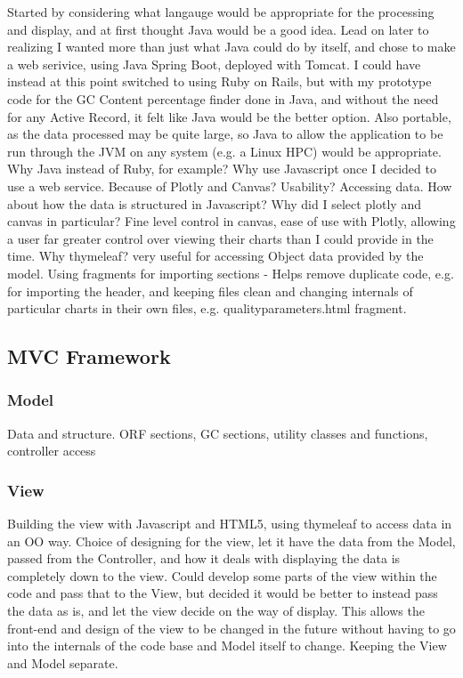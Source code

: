 Started by considering what langauge would be appropriate for the processing and display, and at first thought Java would be a good idea. Lead on later to realizing I wanted more than just what Java could do by itself, and chose to make a web serivice, using Java Spring Boot, deployed with Tomcat. I could have instead at this point switched to using Ruby on Rails, but with my prototype code for the GC Content percentage finder done in Java, and without the need for any Active Record, it felt like Java would be the better option. Also portable, as the data processed may be quite large, so Java to allow the application to be run through the JVM on any system (e.g. a Linux HPC) would be appropriate.
Why Java instead of Ruby, for example?
Why use Javascript once I decided to use a web service. Because of Plotly and Canvas? Usability? Accessing data. How about how the data is structured in Javascript?
Why did I select plotly and canvas in particular? Fine level control in canvas, ease of use with Plotly, allowing a user far greater control over viewing their charts than I could provide in the time.
Why thymeleaf? very useful for accessing Object data provided by the model. Using fragments for importing sections - Helps remove duplicate code, e.g. for importing the header, and keeping files clean and changing internals of particular charts in their own files, e.g. qualityparameters.html fragment.


\subsection{MVC Framework}
\subsubsection{Model}
Data and structure. ORF sections, GC sections, utility classes and functions, controller access
\subsubsection{View}
Building the view with Javascript and HTML5, using thymeleaf to access data in an OO way.
Choice of designing for the view, let it have the data from the Model, passed from the Controller, and how it deals with displaying the data is completely down to the view. Could develop some parts of the view within the code and pass that to the View, but decided it would be better to instead pass the data as is, and let the view decide on the way of display. This allows the front-end and design of the view to be changed in the future without having to go into the internals of the code base and Model itself to change. Keeping the View and Model separate.
